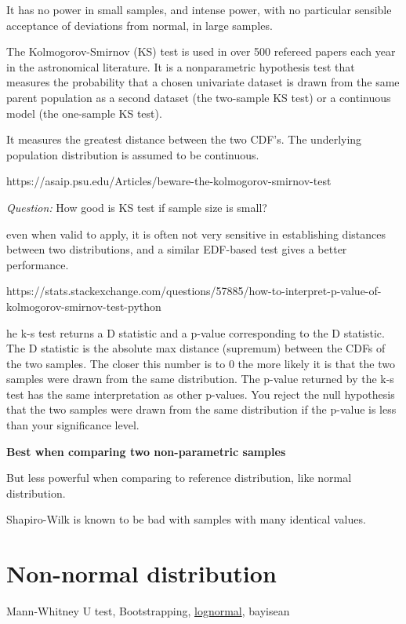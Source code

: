 \documentclass[11pt]{article}
\begin{document}
It has no power in small samples, and intense power, with no particular
sensible acceptance of deviations from normal, in large samples.

The Kolmogorov-Smirnov (KS) test is used in over 500 refereed papers
each year in the astronomical literature. It is a nonparametric
hypothesis test that measures the probability that a chosen univariate
dataset is drawn from the same parent population as a second dataset
(the two-sample KS test) or a continuous model (the one-sample KS test).

It measures the greatest distance between the two CDF's. The underlying
population distribution is assumed to be continuous.

https://asaip.psu.edu/Articles/beware-the-kolmogorov-smirnov-test

\emph{Question:} How good is KS test if sample size is small?

even when valid to apply, it is often not very sensitive in establishing
distances between two distributions, and a similar EDF-based test gives
a better performance.

https://stats.stackexchange.com/questions/57885/how-to-interpret-p-value-of-kolmogorov-smirnov-test-python

he k-s test returns a D statistic and a p-value corresponding to the D
statistic. The D statistic is the absolute max distance (supremum)
between the CDFs of the two samples. The closer this number is to 0 the
more likely it is that the two samples were drawn from the same
distribution. The p-value returned by the k-s test has the same
interpretation as other p-values. You reject the null hypothesis that
the two samples were drawn from the same distribution if the p-value is
less than your significance level.

\textbf{Best when comparing two non-parametric samples}

But less powerful when comparing to reference distribution, like normal
distribution.

Shapiro-Wilk is known to be bad with samples with many identical values.

\section{Non-normal distribution}\label{non-normal-distribution}

Mann-Whitney U test, Bootstrapping,
\href{https://amstat.tandfonline.com/doi/full/10.1080/10691898.2005.11910638\#.XQvVFtNKhQI}{lognormal},
bayisean
\end{document}
